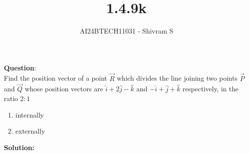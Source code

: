 \documentclass[journal]{IEEEtran}
\begin{document}

\vspace{3cm}

\title{1.4.9k}
\author{AI24BTECH11031 - Shivram S
}
{\let\newpage\relax\maketitle}

\renewcommand{\thefigure}{\theenumi}
\renewcommand{\thetable}{\theenumi}
\setlength{\intextsep}{10pt} %


\renewcommand{\thetable}{\theenumi}


\textbf{Question}:\\
Find the position vector of a point $\vec R$ which divides the line joining two points $\vec P$ and $\vec Q$ whose position vectors are $\hat{i} + 2 \hat{j} - \hat{k}$ and $-\hat{i} + \hat{j} + \hat{k}$ respectively, in the ratio $2:1$

\begin{enumerate}
	\item internally
	\item externally
\end{enumerate}

\textbf{Solution: }
\end{document}
